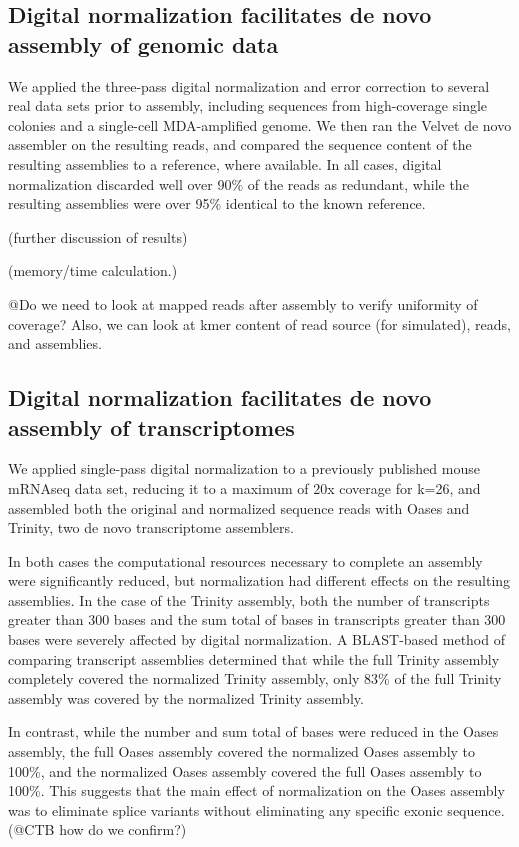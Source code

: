 \documentclass[10pt,draft]{article}
\begin{document}
\subsection*{Digital normalization facilitates de novo assembly of genomic data}

We applied the three-pass digital normalization and error correction
to several real data sets prior to assembly, including sequences from
high-coverage single colonies and a single-cell MDA-amplified genome.
We then ran the Velvet de novo assembler on the resulting reads, and
compared the sequence content of the resulting assemblies to a
reference, where available.  In all cases, digital normalization
discarded well over 90\% of the reads as redundant, while the
resulting assemblies were over 95\% identical to the known reference.

(further discussion of results)

(memory/time calculation.)

@Do we need to look at mapped reads after assembly to verify uniformity
of coverage? Also, we can look at kmer content of read source (for
simulated), reads, and assemblies.

\subsection*{Digital normalization facilitates de novo assembly of transcriptomes}

We applied single-pass digital normalization to a previously published
mouse mRNAseq data set, reducing it to a maximum of 20x coverage for
k=26, and assembled both the original and normalized sequence reads
with Oases and Trinity, two de novo transcriptome assemblers.

In both cases the computational resources necessary to complete an
assembly were significantly reduced, but normalization had different
effects on the resulting assemblies.  In the case of the Trinity
assembly, both the number of transcripts greater than 300 bases and
the sum total of bases in transcripts greater than 300 bases were
severely affected by digital normalization.  A BLAST-based method of
comparing transcript assemblies determined that while the full Trinity assembly
completely covered the normalized Trinity assembly, only 83\% of the
full Trinity assembly was covered by the normalized Trinity assembly.

In contrast, while the number and sum total of bases were reduced in
the Oases assembly, the full Oases assembly covered the normalized
Oases assembly to 100\%, and the normalized Oases assembly covered the
full Oases assembly to 100\%.  This suggests that the main effect of
normalization on the Oases assembly was to eliminate splice variants
without eliminating any specific exonic sequence. (@CTB how do we confirm?)
\end{document}

